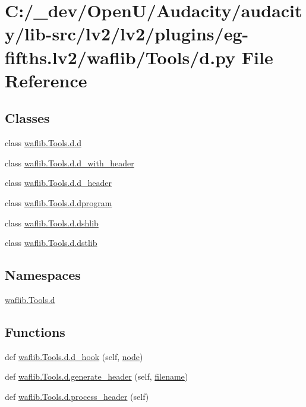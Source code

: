 \hypertarget{lv2_2plugins_2eg-fifths_8lv2_2waflib_2_tools_2d_8py}{}\section{C\+:/\+\_\+dev/\+Open\+U/\+Audacity/audacity/lib-\/src/lv2/lv2/plugins/eg-\/fifths.lv2/waflib/\+Tools/d.py File Reference}
\label{lv2_2plugins_2eg-fifths_8lv2_2waflib_2_tools_2d_8py}
\subsection*{Classes}
\begin{DoxyCompactItemize}
\item 
class \hyperlink{classwaflib_1_1_tools_1_1d_1_1d}{waflib.\+Tools.\+d.\+d}
\item 
class \hyperlink{classwaflib_1_1_tools_1_1d_1_1d__with__header}{waflib.\+Tools.\+d.\+d\+\_\+with\+\_\+header}
\item 
class \hyperlink{classwaflib_1_1_tools_1_1d_1_1d__header}{waflib.\+Tools.\+d.\+d\+\_\+header}
\item 
class \hyperlink{classwaflib_1_1_tools_1_1d_1_1dprogram}{waflib.\+Tools.\+d.\+dprogram}
\item 
class \hyperlink{classwaflib_1_1_tools_1_1d_1_1dshlib}{waflib.\+Tools.\+d.\+dshlib}
\item 
class \hyperlink{classwaflib_1_1_tools_1_1d_1_1dstlib}{waflib.\+Tools.\+d.\+dstlib}
\end{DoxyCompactItemize}
\subsection*{Namespaces}
\begin{DoxyCompactItemize}
\item 
 \hyperlink{namespacewaflib_1_1_tools_1_1d}{waflib.\+Tools.\+d}
\end{DoxyCompactItemize}
\subsection*{Functions}
\begin{DoxyCompactItemize}
\item 
def \hyperlink{namespacewaflib_1_1_tools_1_1d_a0b6f5907fb19962703822b05f5d2c7f6}{waflib.\+Tools.\+d.\+d\+\_\+hook} (self, \hyperlink{structnode}{node})
\item 
def \hyperlink{namespacewaflib_1_1_tools_1_1d_abeab4cb06670217a6a35b8a77933e947}{waflib.\+Tools.\+d.\+generate\+\_\+header} (self, \hyperlink{test__portburn_8cpp_a7efa5e9c7494c7d4586359300221aa5d}{filename})
\item 
def \hyperlink{namespacewaflib_1_1_tools_1_1d_ae7724c426c7d6b03c2f1e81bf03f40a9}{waflib.\+Tools.\+d.\+process\+\_\+header} (self)
\end{DoxyCompactItemize}
